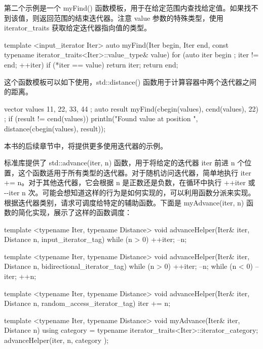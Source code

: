 第二个示例是一个 myFind() 函数模板，用于在给定范围内查找给定值。如果找不到该值，则返回范围的结束迭代器。注意 value 参数的特殊类型，使用 iterator\_traits 获取给定迭代器指向值的类型。

\begin{cpp}
template <input_iterator Iter>
auto myFind(Iter begin, Iter end,
    const typename iterator_traits<Iter>::value_type& value)
{
    for (auto iter { begin }; iter != end; ++iter) {
        if (*iter == value) { return iter; }
    }
    return end;
}
\end{cpp}

这个函数模板可以如下使用，std::distance() 函数用于计算容器中两个迭代器之间的距离。

\begin{cpp}
vector values { 11, 22, 33, 44 };
auto result { myFind(cbegin(values), cend(values), 22) };
if (result != cend(values)) {
    println("Found value at position {}", distance(cbegin(values), result));
}
\end{cpp}

本书的后续章节中，将提供更多使用迭代器的示例。


标准库提供了 std::advance(iter, n) 函数，用于将给定的迭代器 iter 前进 n 个位置，这个函数适用于所有类型的迭代器。对于随机访问迭代器，简单地执行 iter += n。对于其他迭代器，它会根据 n 是正数还是负数，在循环中执行 ++iter 或 -{}-iter n 次。可能会想知道这样的行为是如何实现的，可以利用函数分派来实现。根据迭代器类别，请求可调度给特定的辅助函数。下面是 myAdvance(iter, n) 函数的简化实现，展示了这样的函数调度：

\begin{cpp}
template <typename Iter, typename Distance>
void advanceHelper(Iter& iter, Distance n, input_iterator_tag)
{
    while (n > 0) { ++iter; --n; }
}

template <typename Iter, typename Distance>
void advanceHelper(Iter& iter, Distance n, bidirectional_iterator_tag)
{
    while (n > 0) { ++iter; --n; }
    while (n < 0) { --iter; ++n; }
}

template <typename Iter, typename Distance>
void advanceHelper(Iter& iter, Distance n, random_access_iterator_tag)
{
    iter += n;
}

template <typename Iter, typename Distance>
void myAdvance(Iter& iter, Distance n)
{
    using category = typename iterator_traits<Iter>::iterator_category;
    advanceHelper(iter, n, category {});
}
\end{cpp}

